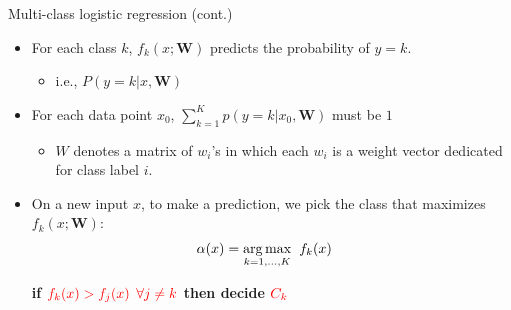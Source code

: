\documentclass[serif, aspectratio=169]{beamer}
\begin{document}
\begin{frame}{Multi-class logistic regression (cont.)}
    \begin{itemize}
         \item For each class $k$, $f_k(x; \mathbf{W})$ predicts the probability of $y=k$.
            \begin{itemize}
                \item i.e., $P(y=k|x, \mathbf{W})$
            \end{itemize}
        \item For each data point $x_0$, $\sum _{k=1}^{K} p(y=k|x_0, \mathbf{W})$ must be $1$
            \begin{itemize}
                \item $W$ denotes a matrix of $w_i$'s in which each $w_i$ is a weight vector dedicated for class label $i$.
            \end{itemize}
        \item On a new input $x$, to make a prediction, we pick the class that maximizes $f_k(x; \mathbf{W})$:
            \begin{align*}
                \alpha (x) &= \underset{k=1, \dots , K}{\arg\max} \hspace{0.2cm} f_k(x) 
            \end{align*}
            \begin{center}
                \textbf{if $\color{red} f_k(x) > f_j(x)$ $\color{red} \forall j \neq k$ then decide $\color{red} C_k$}
            \end{center}
    \end{itemize}
\end{frame}
\end{document}
